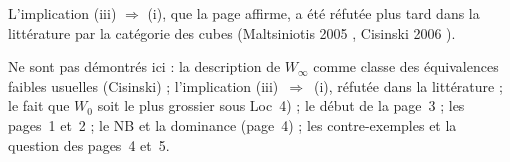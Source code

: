 \begin{remarque}
L'implication (iii) $\Rightarrow$ (i), que la page affirme, a été réfutée plus tard dans la littérature par la catégorie des cubes (Maltsiniotis 2005 \cite{maltsiniotis2005}, Cisinski 2006 \cite{cisinski2006}).
\end{remarque}

Ne sont pas démontrés ici : la description de $W_\infty$ comme classe des équivalences faibles usuelles (Cisinski) ; l'implication (iii)~$\Rightarrow$~(i), réfutée dans la littérature ; le fait que $W_0$ soit le plus grossier sous Loc~4) ; le début de la page~3 ; les pages~1 et~2 ; le NB et la dominance (page~4) ; les contre-exemples et la question des pages~4 et~5.
